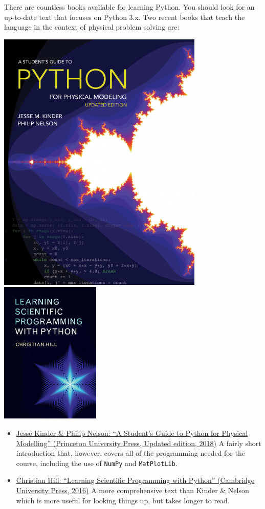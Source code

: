 \documentclass[10pt]{article}
\begin{document}
There are countless books available for learning Python. You should look
for an up-to-date text that focuses on Python 3.x. Two recent books that
teach the language in the context of physical problem solving are:

\includegraphics[scale=0.3]{KinderNelson.png} \includegraphics[scale=0.55]{Hill.jpg}

\begin{itemize}
\item
   \href{https://press.princeton.edu/titles/11349.html}{Jesse Kinder \&
  Philip Nelson: ``A Student's Guide to Python for Physical Modelling''
  (Princeton University Press, Updated edition, 2018)} A fairly short
  introduction that, however, covers all of the programming needed for
  the course, including the use of \texttt{NumPy} and
  \texttt{MatPlotLib}.
\item

  \href{http://www.cambridge.org/gb/academic/subjects/physics/computational-science-and-modelling/learning-scientific-programming-python?format=PB}{Christian
  Hill: ``Learning Scientific Programming with Python'' (Cambridge
  University Press, 2016)} A more comprehensive text than Kinder \&
  Nelson which is more useful for looking things up, but takes longer to
  read.
\end{itemize}
\end{document}
